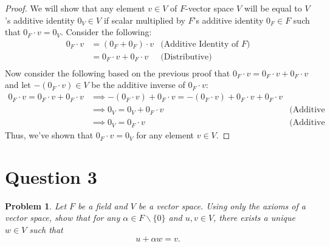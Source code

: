 \documentclass[12pt, letterpaper]{article}
\theoremstyle{plain}
\newtheorem{prob}[theorem]{Problem}
\theoremstyle{definition}
\theoremstyle{remark}
\begin{document}
\begin{proof}
We will show that any element $v\in V$ of $F$-vector space $V$ will be equal to $V$'s additive identity $0_V\in V$ if scalar multiplied by $F$'s additive identity $0_F\in F$ such that $0_F\cdot v=0_V$. Consider the following:
\begin{align*}
    0_F\cdot v &= (0_F+0_F)\cdot v      &\text{(Additive Identity of $F$)} \\
               &= 0_F\cdot v+0_F\cdot v &\text{(Distributive)} \\
\end{align*}
Now consider the following based on the previous proof that $0_F\cdot v=0_F\cdot v+0_F\cdot v$ and let $-(0_F\cdot v)\in V$ be the additive inverse of $0_F\cdot v$:
\begin{align*}
    0_F\cdot v=0_F\cdot v+0_F\cdot v &\implies -(0_F\cdot v)+0_F\cdot v=-(0_F\cdot v)+0_F\cdot v+0_F\cdot v \\
                                     &\implies 0_V=0_V+0_F\cdot v &\text{(Additive Inverse)} \\
                                     &\implies 0_V=0_F\cdot v     &\text{(Additive Identity)}
\end{align*}
Thus, we've shown that $0_F\cdot v=0_V$ for any element $v\in V$.
\end{proof}


\section{Question 3} %

\begin{prob}
    Let $F$ be a field and $V$ be a vector space. Using only the axioms of a vector space, show that for any $\alpha\in F\backslash\{0\}$ and $u,v\in V$, there exists a unique $w\in V$ such that $$u+\alpha w=v.$$
\end{prob}
\end{document}
